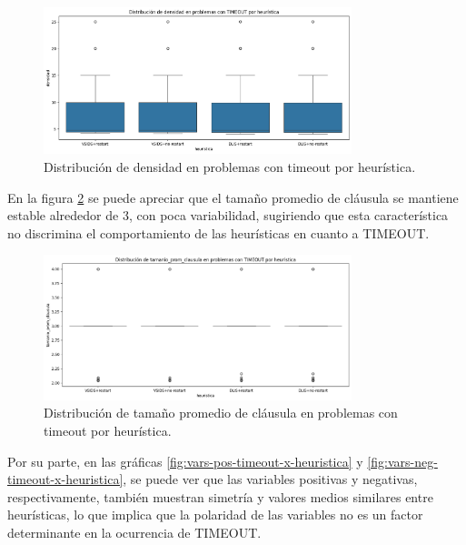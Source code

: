 \begin{figure}[ht]
    \centering
    \includegraphics[width=0.8\textwidth]{Graphics/densidad_timeout_x_heuristica.png}
    \caption{Distribuci\'on de densidad en problemas con timeout por heur\'istica.}
    \label{fig:densidad-timeout-x-heuristica}
\end{figure}

En la figura \ref{fig:tamanio-prom-claus-timeout-x-heuristica} se puede apreciar que el tamaño promedio de cláusula se mantiene estable alrededor de 3, con poca variabilidad, sugiriendo que esta característica no discrimina el comportamiento de las heurísticas en cuanto a TIMEOUT.

\begin{figure}[ht]
    \centering
    \includegraphics[width=0.8\textwidth]{Graphics/tamanio_prom_claus_timeout_x_heuristica.png}
    \caption{Distribuci\'on de tama\~no promedio de cl\'ausula en problemas con timeout por heur\'istica.}
    \label{fig:tamanio-prom-claus-timeout-x-heuristica}
\end{figure}

Por su parte, en las gr\'aficas \ref{fig:vars-pos-timeout-x-heuristica} y \ref{fig:vars-neg-timeout-x-heuristica}, se puede ver que las variables positivas y negativas, respectivamente, también muestran simetría y valores medios similares entre heurísticas, lo que implica que la polaridad de las variables no es un factor determinante en la ocurrencia de TIMEOUT.

